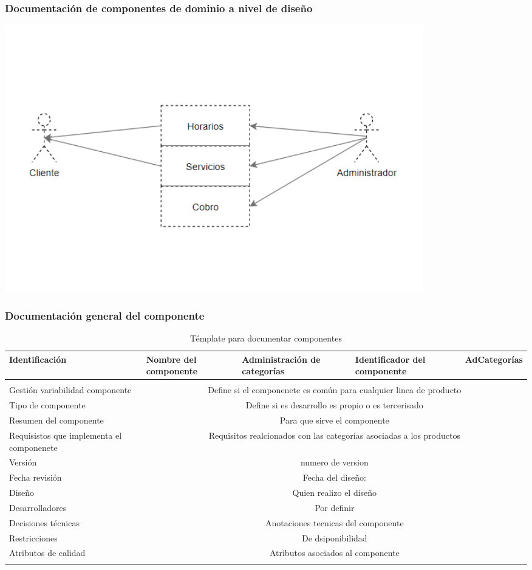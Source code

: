 \documentclass[10pt,a4paper,openany]{book}
\begin{document}
\subsubsection{Documentación de componentes de dominio a nivel de diseño}
\begin{center}
\includegraphics[width=0.8\textwidth]{dominio}
\end{center}

\subsubsection{Documentación general del componente }

\begin{longtable}{|p{3cm}|p{3cm}|p{3cm}|p{3cm}|p{3cm}|} \hline
Identificación & Nombre del componente & Administración de categorías & Identificador del componente & AdCategorías \\[0.5ex] \hline
& & & & \\[0.5ex] \hline
Gestión variabilidad componente & \multicolumn{4}{|c|}{Define si el componenete es común para cualquier linea de producto} \\ \hline
Tipo de componente & \multicolumn{4}{|c|}{Define si es desarrollo es propio o es tercerisado} \\ \hline
Resumen del componente & \multicolumn{4}{|c|}{Para que sirve el componente} \\ \hline
Requisistos que implementa el componenete & \multicolumn{4}{|c|}{Requisitos realcionados con las categorías asociadas a los productos } \\ \hline
Versión & \multicolumn{4}{|c|}{ numero de version } \\ \hline
Fecha revisión & \multicolumn{4}{|c|}{ Fecha del diseño:} \\ \hline
Diseño & \multicolumn{4}{|c|}{Quien realizo el diseño} \\ \hline
Desarrolladores & \multicolumn{4}{|c|}{Por definir} \\ \hline
Decisiones técnicas & \multicolumn{4}{|c|}{Anotaciones tecnicas del componente} \\ \hline
Restricciones & \multicolumn{4}{|c|}{De dsiponibilidad} \\ \hline
Atributos de calidad & \multicolumn{4}{|c|}{Atributos asociados al componente} \\ \hline
\caption{Témplate para documentar componentes}
\label{table:t6}
\end{longtable}
\end{document}
